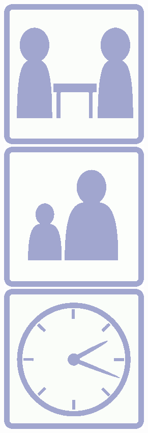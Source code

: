 \documentclass[a5paper, DIV=18, 12pt]{scrartcl}
\begin{document}
\includegraphics[scale=0.125]{Images/Icons/player_count_icon_purple.png} {\setmainfont[Scale=1.25]{Fredoka-Bold}\Huge \raisebox{6.55pt}{\textcolor{SunriseBlue}{:\ 2-6}}} \hfill \includegraphics[scale=0.125]{Images/Icons/player_age_icon_purple.png} {\setmainfont[Scale=1.125]{Fredoka-Bold}\Huge \raisebox{6.55pt}{\textcolor{SunriseBlue}{:\ 8+}}}\hfill \includegraphics[scale=0.125]{Images/Icons/playtime_icon_purple.png} {\setmainfont[Scale=1.125]{Fredoka-Bold}\Huge \raisebox{6.55pt}{\textcolor{SunriseBlue}{:\ 20-30}}}
\end{document}
